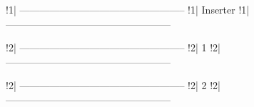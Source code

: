 !1| --------------------------------------------------
!1| Inserter
!1| --------------------------------------------------

!2| --------------------------------------------------
!2| 1
!2| --------------------------------------------------



\usepackage{geometry}

!2| --------------------------------------------------
!2| 2
!2| --------------------------------------------------


\usepackage[left=1cm, right=1cm, top=1cm, bottom=1cm]{geometry}
